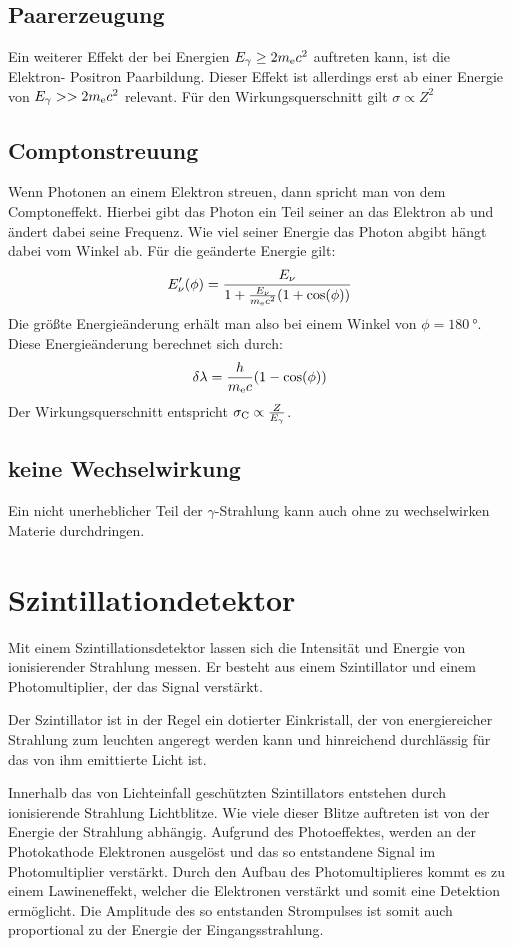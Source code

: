 \documentclass[11pt, ngerman, fleqn, DIV=15, headinclude, BCOR=2cm]{scrreprt}
\begin{document}
\subsection{Paarerzeugung}
Ein weiterer Effekt der bei Energien $E_\gamma \ge 2m_\text ec^2$ auftreten
kann, ist die Elektron- Positron Paarbildung.
Dieser Effekt ist allerdings erst ab einer Energie von $E_\gamma >> 2m_\text
ec^2$ relevant.
Für den Wirkungsquerschnitt gilt $\sigma \propto Z^2$

\subsection{Comptonstreuung}
Wenn Photonen an einem Elektron streuen, dann spricht man von dem
Comptoneffekt. 
Hierbei gibt das Photon ein Teil seiner an das Elektron ab und ändert dabei
seine Frequenz.
Wie viel seiner Energie das Photon abgibt hängt dabei vom Winkel ab.
Für die geänderte Energie gilt:
\[
    E_\nu'(\phi) = \frac{E_\nu}{1+\frac{E_\nu}{m_\text ec^2}(1+\cos(\phi))}
\]
Die größte Energieänderung erhält man also bei einem Winkel von
$\phi=\SI{180}{\degree}$.
Diese Energieänderung berechnet sich durch:
\[
    \delta\lambda = \frac{h}{m_\text ec}(1-\cos(\phi))
\]
Der Wirkungsquerschnitt entspricht $\sigma_\text C \propto \frac{Z}{E_\gamma}$.

\subsection{keine Wechselwirkung}
Ein nicht unerheblicher Teil der $\gamma$-Strahlung kann auch ohne zu
wechselwirken Materie durchdringen.

\section{Szintillationdetektor}
Mit einem Szintillationsdetektor lassen sich die Intensität und Energie von
ionisierender Strahlung messen.
Er besteht aus einem Szintillator und einem Photomultiplier, der das Signal
verstärkt.

Der Szintillator ist in der Regel ein dotierter Einkristall, der von
energiereicher Strahlung zum leuchten angeregt werden kann und hinreichend
durchlässig für das von ihm emittierte Licht ist.

Innerhalb das von Lichteinfall geschützten Szintillators entstehen durch
ionisierende Strahlung Lichtblitze. 
Wie viele dieser Blitze auftreten ist von der Energie der Strahlung abhängig.
Aufgrund des Photoeffektes, werden an der Photokathode Elektronen ausgelöst und
das so entstandene Signal im Photomultiplier verstärkt.
Durch den Aufbau des Photomultiplieres kommt es zu einem Lawineneffekt, welcher
die Elektronen verstärkt und somit eine Detektion ermöglicht.
Die Amplitude des so entstanden Strompulses ist somit auch proportional zu der
Energie der Eingangsstrahlung.
\end{document}
